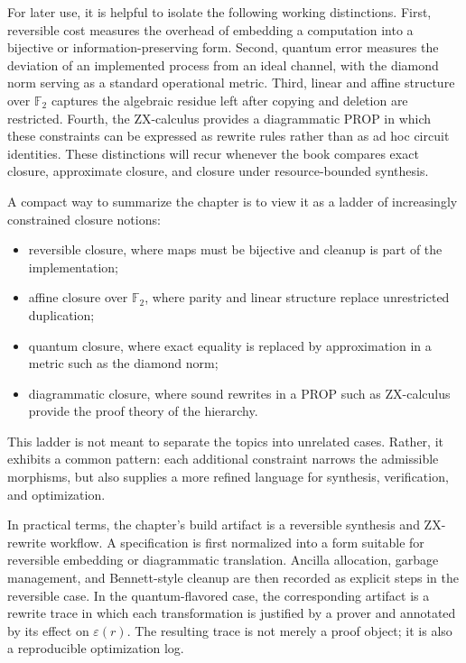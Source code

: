 For later use, it is helpful to isolate the following working distinctions. First, reversible cost measures the overhead of embedding a computation into a bijective or information-preserving form. Second, quantum error measures the deviation of an implemented process from an ideal channel, with the diamond norm serving as a standard operational metric. Third, linear and affine structure over \(\mathbb{F}_2\) captures the algebraic residue left after copying and deletion are restricted. Fourth, the ZX-calculus provides a diagrammatic PROP in which these constraints can be expressed as rewrite rules rather than as ad hoc circuit identities. These distinctions will recur whenever the book compares exact closure, approximate closure, and closure under resource-bounded synthesis.

A compact way to summarize the chapter is to view it as a ladder of increasingly constrained closure notions:
\begin{itemize}
  \item reversible closure, where maps must be bijective and cleanup is part of the implementation;
  \item affine closure over \(\mathbb{F}_2\), where parity and linear structure replace unrestricted duplication;
  \item quantum closure, where exact equality is replaced by approximation in a metric such as the diamond norm;
  \item diagrammatic closure, where sound rewrites in a PROP such as ZX-calculus provide the proof theory of the hierarchy.
\end{itemize}
This ladder is not meant to separate the topics into unrelated cases. Rather, it exhibits a common pattern: each additional constraint narrows the admissible morphisms, but also supplies a more refined language for synthesis, verification, and optimization.

In practical terms, the chapter’s build artifact is a reversible synthesis and ZX-rewrite workflow. A specification is first normalized into a form suitable for reversible embedding or diagrammatic translation. Ancilla allocation, garbage management, and Bennett-style cleanup are then recorded as explicit steps in the reversible case. In the quantum-flavored case, the corresponding artifact is a rewrite trace in which each transformation is justified by a prover and annotated by its effect on \(\varepsilon(r)\). The resulting trace is not merely a proof object; it is also a reproducible optimization log.

